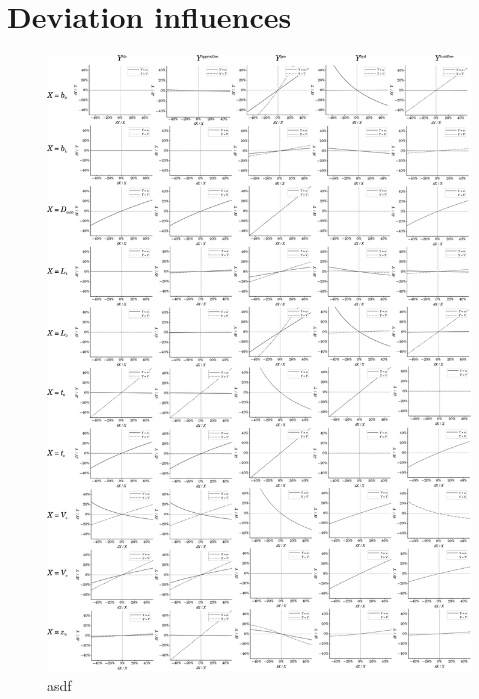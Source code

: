 \section*{Deviation influences}
\begin{figure}[H]
  \begin{center}
    \includegraphics[width=\linewidth]{./images/deltaAnalysis.pdf}
  \end{center}
  \vspace*{-3ex}
  \caption[asdf]{asdf}
  \label{fig:DeviationAnalysis}
\end{figure}
